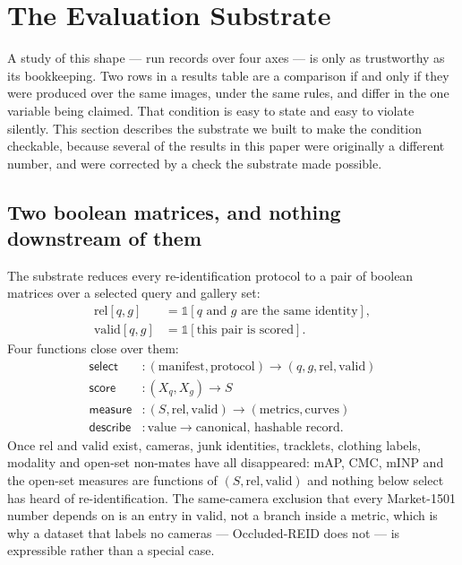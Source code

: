 \section{The Evaluation Substrate}\label{sec:substrate}
A study of this shape --- \nRuns{} run records over four axes --- is only as trustworthy as its
bookkeeping. Two rows in a results table are a comparison if and only if they were produced
over the same images, under the same rules, and differ in the one variable being claimed. That
condition is easy to state and easy to violate silently. This section describes the substrate
we built to make the condition checkable, because several of the results in this paper were
originally a different number, and were corrected by a check the substrate made possible.

\subsection{Two boolean matrices, and nothing downstream of them}
The substrate reduces every re-identification protocol to a pair of boolean matrices over a
selected query and gallery set:
\begin{align}
  \mathrm{rel}[q,g]   &= \mathbb{1}[\text{$q$ and $g$ are the same identity}], \\
  \mathrm{valid}[q,g] &= \mathbb{1}[\text{this pair is scored}].
\end{align}
Four functions close over them:
\begin{align}
  \textsf{select}&: (\text{manifest}, \text{protocol}) \rightarrow (q, g, \mathrm{rel},
     \mathrm{valid}) \nonumber\\
  \textsf{score}&: (X_q, X_g) \rightarrow S \nonumber\\
  \textsf{measure}&: (S, \mathrm{rel}, \mathrm{valid}) \rightarrow
     (\text{metrics}, \text{curves}) \nonumber\\
  \textsf{describe}&: \text{value} \rightarrow \text{canonical, hashable record.} \nonumber
\end{align}
Once $\mathrm{rel}$ and $\mathrm{valid}$ exist, cameras, junk identities, tracklets, clothing
labels, modality and open-set non-mates have all disappeared: mAP, CMC, mINP and the open-set
measures are functions of $(S, \mathrm{rel}, \mathrm{valid})$ and nothing below
\textsf{select} has heard of re-identification. The same-camera exclusion that every
Market-1501 number depends on is an entry in $\mathrm{valid}$, not a branch inside a metric,
which is why a dataset that labels no cameras --- Occluded-REID does not --- is expressible
rather than a special case.

